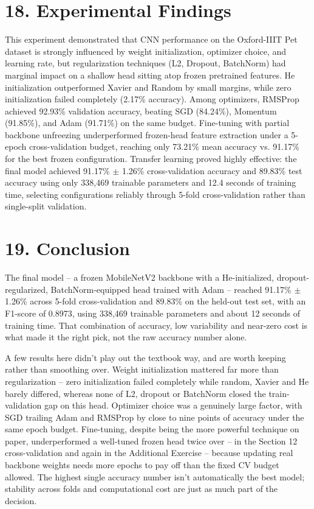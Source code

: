 \documentclass[10pt]{article}
\begin{document}
\section*{18. Experimental Findings}

This experiment demonstrated that CNN performance on the Oxford-IIIT Pet dataset
is strongly influenced by weight initialization, optimizer choice, and learning
rate, but regularization techniques (L2, Dropout, BatchNorm) had marginal impact
on a shallow head sitting atop frozen pretrained features. He initialization
outperformed Xavier and Random by small margins, while zero initialization failed
completely (2.17\% accuracy). Among optimizers, RMSProp achieved 92.93\% validation
accuracy, beating SGD (84.24\%), Momentum (91.85\%), and Adam (91.71\%) on the same
budget. Fine-tuning with partial backbone unfreezing underperformed frozen-head
feature extraction under a 5-epoch cross-validation budget, reaching only 73.21\%
mean accuracy vs. 91.17\% for the best frozen configuration. Transfer learning
proved highly effective: the final model achieved 91.17\% $\pm$ 1.26\% cross-validation
accuracy and 89.83\% test accuracy using only 338,469 trainable parameters and
12.4 seconds of training time, selecting configurations reliably through 5-fold
cross-validation rather than single-split validation.

\section*{19. Conclusion}

The final model -- a frozen MobileNetV2 backbone with a He-initialized,
dropout-regularized, BatchNorm-equipped head trained with Adam -- reached
91.17\% $\pm$ 1.26\% across 5-fold cross-validation and 89.83\% on the held-out
test set, with an F1-score of 0.8973, using 338,469 trainable parameters and
about 12 seconds of training time. That combination of accuracy, low
variability and near-zero cost is what made it the right pick, not the raw
accuracy number alone.

A few results here didn't play out the textbook way, and are worth keeping
rather than smoothing over. Weight initialization mattered far more than
regularization -- zero initialization failed completely while random, Xavier
and He barely differed, whereas none of L2, dropout or BatchNorm closed the
train-validation gap on this head. Optimizer choice was a genuinely large
factor, with SGD trailing Adam and RMSProp by close to nine points of
accuracy under the same epoch budget. Fine-tuning, despite being the more
powerful technique on paper, underperformed a well-tuned frozen head twice
over -- in the Section 12 cross-validation and again in the Additional
Exercise -- because updating real backbone weights needs more epochs to pay
off than the fixed CV budget allowed. The highest single accuracy number
isn't automatically the best model; stability across folds and computational
cost are just as much part of the decision.
\end{document}
